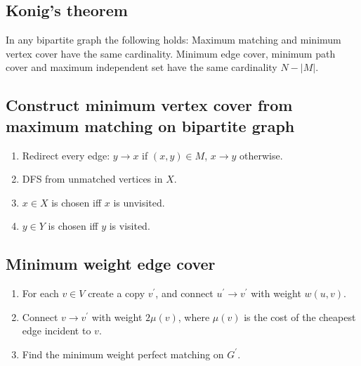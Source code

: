 \subsection{Konig's theorem}
In any bipartite graph the following holds: Maximum matching and minimum vertex cover have the same cardinality.
Minimum edge cover, minimum path cover and maximum independent set have the same cardinality $N - |M|$.\\

\subsection{Construct minimum vertex cover from maximum matching on bipartite graph}
\vspace{-0.2em}
\begin{enumerate}
	\itemsep-0.8em
	\item Redirect every edge: $y \rightarrow x$ if $(x, y) \in M$, $x \rightarrow y$ otherwise.
	\item DFS from unmatched vertices in $X$.
	\item $x \in X$ is chosen iff $x$ is unvisited.
	\item $y \in Y$ is chosen iff $y$ is visited.
\end{enumerate}

\subsection{Minimum weight edge cover}
\vspace{-0.2em}
    \begin{enumerate}
	  \itemsep-0.8em
      \item For each $v \in V$ create a copy $v^\prime$, and connect $u^\prime \to v^\prime$ with weight $w(u, v)$.
      \item Connect $v \to v^\prime$ with weight $2\mu(v)$, where $\mu(v)$ is the cost of the cheapest edge incident to $v$.
      \item Find the minimum weight perfect matching on $G^\prime$.
    \end{enumerate}

